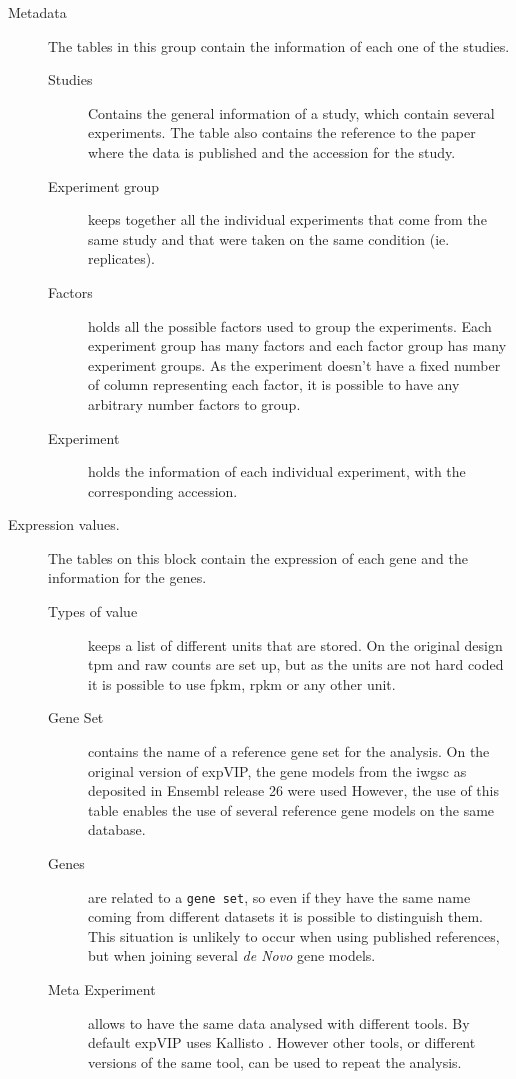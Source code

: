 \begin{description}
\item[Metadata] The tables in this group contain the information of each one of the studies. 
\begin{description}
\item[Studies] Contains the general information of a study, which contain several experiments. The table also contains the reference to the paper where the data is published and the accession for the study. 
\item[Experiment group] keeps together all the individual experiments that come from the same study and that were taken on the same condition (ie. replicates). 
\item[Factors] holds all the possible factors used to group the experiments. Each experiment group has many factors and each factor group has many experiment groups. As the experiment doesn't have a fixed number of column representing each factor, it is possible to have any arbitrary number factors to group. 
\item[Experiment] holds the information of each individual experiment, with the corresponding accession. 
\end{description}
\item[Expression values.] The tables on this block contain the expression of each gene and the information for the genes. 
\begin{description}
\item[Types of value] keeps a list of different units that are stored. On the original design \acrshort{tpm} and raw counts are set up, but as the units are not hard coded it is possible to use \acrshort{fpkm}, \acrshort{rpkm} or any other unit. 
\item[Gene Set] contains the name of a reference gene set for the analysis. On the original version of expVIP, the gene models from the \acrshort{iwgsc} as deposited in Ensembl release 26 were used \citep{Mayer2014} However, the use of this table enables the use of several reference gene models on the same database. 
\item[Genes] are related to a \texttt{gene set}, so even if they have the same name coming from different datasets it is possible to distinguish them. This situation is unlikely to occur when using published references, but when joining several \textit{de Novo} gene models. 
\item[Meta Experiment] allows to have the same data analysed with different tools. By default expVIP uses Kallisto \citep{Bray2016}. However other tools, or different versions of the same tool, can be used to repeat the analysis.   

\end{description}
\end{description}
